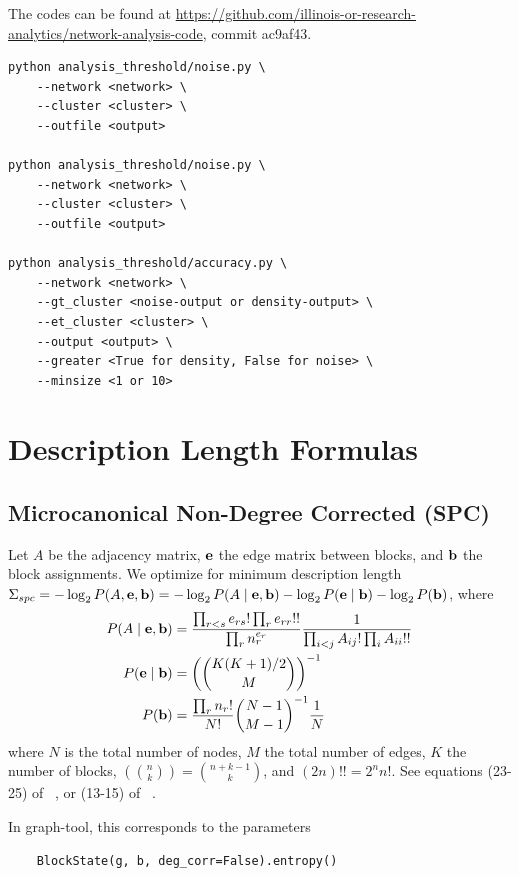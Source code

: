 \documentclass[aps,pre,superscriptaddress]{article}
\begin{document}
The codes can be found at \url{https://github.com/illinois-or-research-analytics/network-analysis-code}, commit ac9af43.
\begin{lstlisting}
python analysis_threshold/noise.py \
    --network <network> \
    --cluster <cluster> \
    --outfile <output>

python analysis_threshold/noise.py \
    --network <network> \
    --cluster <cluster> \
    --outfile <output>

python analysis_threshold/accuracy.py \
    --network <network> \
    --gt_cluster <noise-output or density-output> \
    --et_cluster <cluster> \
    --output <output> \
    --greater <True for density, False for noise> \
    --minsize <1 or 10>
\end{lstlisting}

\section{Description Length Formulas}
\label{sbm-formulas}

\subsection{Microcanonical Non-Degree Corrected (SPC)}

Let $A$ be the adjacency matrix, $\vb{e}$ the edge matrix between blocks, and $\vb{b}$ the block assignments.
We optimize for minimum description length $\Sigma_{spc} = -\log_2P(A, \vb{e}, \vb{b}) = -\log_2 P(A \mid \vb{e}, \vb{b}) - \log_2 P(\vb{e} \mid \vb{b}) - \log_2 P(\vb{b})$, where
\begin{align}
	P(A \mid \vb{e}, \vb{b}) & = \frac{\prod_{r < s} e_{rs}! \prod_{r} e_{rr}!!}{\prod_r n_r^{e_r}} \frac{1}{\prod_{i < j} A_{ij}! \prod_{i} A_{ii}!!} \\
	P(\vb{e} \mid \vb{b})    & = \left( \binom{K(K+1)/2}{M} \right)^{-1}                                                                               \\
	P(\vb{b})                & = \frac{\prod_r n_r!}{N!} \binom{N - 1}{M - 1}^{-1} \frac{1}{N}
\end{align}
where $N$ is the total number of nodes, $M$ the total number of edges, $K$ the number of blocks, $\left( \binom{n}{k} \right) = \binom{n + k - 1}{k}$, and $(2n)!! = 2^n n!$.
See equations (23-25) of ~\cite{peixoto17-01}, or (13-15) of ~\cite{funke19-04}.

In graph-tool, this corresponds to the parameters
\begin{verbatim}
    BlockState(g, b, deg_corr=False).entropy()
\end{verbatim}
\end{document}
